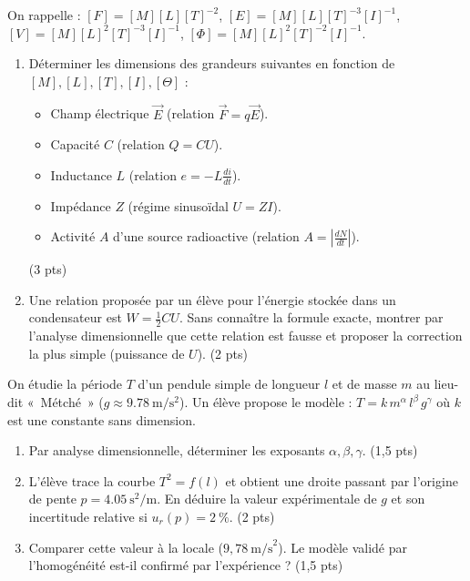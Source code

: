 \documentclass[11pt]{article}
\begin{document}
\begin{exercice}
On rappelle : $[F] = [M][L][T]^{-2}$, $[E] = [M][L][T]^{-3}[I]^{-1}$, $[V] = [M][L]^2[T]^{-3}[I]^{-1}$, $[\Phi] = [M][L]^2[T]^{-2}[I]^{-1}$.
\begin{enumerate}
    \item Déterminer les dimensions des grandeurs suivantes en fonction de $[M], [L], [T], [I], [\Theta]$ :
    \begin{itemize}
        \item Champ électrique $\vec{E}$ (relation $\vec{F} = q\vec{E}$).
        \item Capacité $C$ (relation $Q = C U$).
        \item Inductance $L$ (relation $e = -L \frac{di}{dt}$).
        \item Impédance $Z$ (régime sinusoïdal $U = Z I$).
        \item Activité $A$ d'une source radioactive (relation $A = \left|\frac{dN}{dt}\right|$).
    \end{itemize}
    (3 pts)
    \item Une relation proposée par un élève pour l'énergie stockée dans un condensateur est $W = \frac{1}{2} C U$. Sans connaître la formule exacte, montrer par l'analyse dimensionnelle que cette relation est fausse et proposer la correction la plus simple (puissance de $U$). (2 pts)
\end{enumerate}
\end{exercice}

\begin{exercice}
On étudie la période $T$ d'un pendule simple de longueur $l$ et de masse $m$ au lieu-dit « Métché » ($g \approx \SI{9,78}{\meter\per\second\squared}$). Un élève propose le modèle : $T = k \, m^{\alpha} \, l^{\beta} \, g^{\gamma}$ où $k$ est une constante sans dimension.
\begin{enumerate}
    \item Par analyse dimensionnelle, déterminer les exposants $\alpha, \beta, \gamma$. (1,5 pts)
    \item L'élève trace la courbe $T^2 = f(l)$ et obtient une droite passant par l'origine de pente $p = \SI{4,05}{\second\squared\per\meter}$. En déduire la valeur expérimentale de $g$ et son incertitude relative si $u_r(p) = 2~\%$. (2 pts)
    \item Comparer cette valeur à la locale ($9,78~\text{m/s}^2$). Le modèle validé par l'homogénéité est-il confirmé par l'expérience ? (1,5 pts)
\end{enumerate}
\end{exercice}
\end{document}
